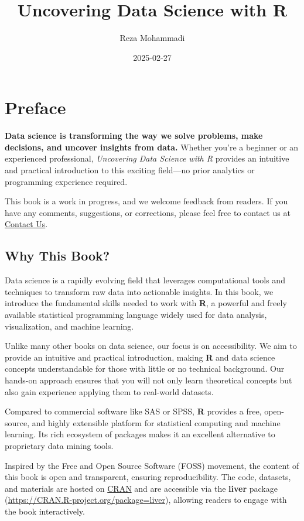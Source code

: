 \documentclass[
]{book}
\title{Uncovering Data Science with R}
\author{Reza Mohammadi}
\date{2025-02-27}
\theoremstyle{definition}
\theoremstyle{definition}
\theoremstyle{definition}
\theoremstyle{definition}
\theoremstyle{remark}
\begin{document}
\maketitle

{
\setcounter{tocdepth}{1}
\tableofcontents
}
\chapter*{Preface}\label{preface}

\textbf{Data science is transforming the way we solve problems, make decisions, and uncover insights from data.} Whether you're a beginner or an experienced professional, \emph{Uncovering Data Science with R} provides an intuitive and practical introduction to this exciting field---no prior analytics or programming experience required.

This book is a work in progress, and we welcome feedback from readers. If you have any comments, suggestions, or corrections, please feel free to contact us at \href{mailto:a.mohammadi@uva.nl}{Contact Us}.

\section*{Why This Book?}\label{why-this-book}

Data science is a rapidly evolving field that leverages computational tools and techniques to transform raw data into actionable insights. In this book, we introduce the fundamental skills needed to work with \textbf{R}, a powerful and freely available statistical programming language widely used for data analysis, visualization, and machine learning.

Unlike many other books on data science, our focus is on accessibility. We aim to provide an intuitive and practical introduction, making \textbf{R} and data science concepts understandable for those with little or no technical background. Our hands-on approach ensures that you will not only learn theoretical concepts but also gain experience applying them to real-world datasets.

Compared to commercial software like SAS or SPSS, \textbf{R} provides a free, open-source, and highly extensible platform for statistical computing and machine learning. Its rich ecosystem of packages makes it an excellent alternative to proprietary data mining tools.

Inspired by the Free and Open Source Software (FOSS) movement, the content of this book is open and transparent, ensuring reproducibility. The code, datasets, and materials are hosted on \href{https://cran.r-project.org/web/packages/liver/index.html}{CRAN} and are accessible via the \textbf{liver} package (\url{https://CRAN.R-project.org/package=liver}), allowing readers to engage with the book interactively.
\end{document}
